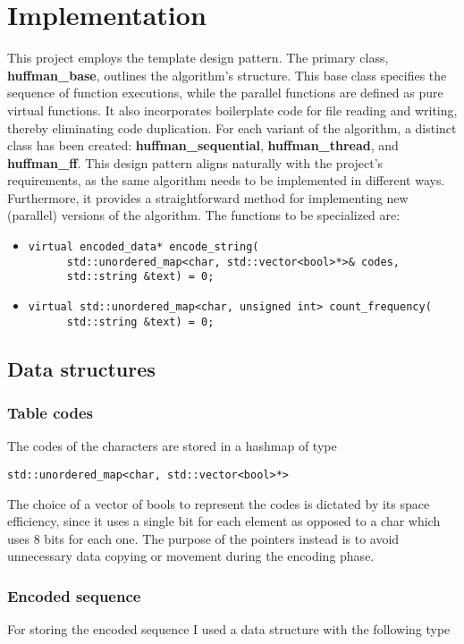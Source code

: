 \documentclass{article}
\begin{document}
\section{Implementation}
This project employs the template design pattern. The primary class, \textbf{huffman\_base}, outlines the algorithm's structure.
This base class specifies the sequence of function executions, while the parallel functions are defined as pure virtual functions.
It also incorporates boilerplate code for file reading and writing, thereby eliminating code duplication.
For each variant of the algorithm, a distinct class has been created: \textbf{huffman\_sequential}, \textbf{huffman\_thread}, and \textbf{huffman\_ff}.
This design pattern aligns naturally with the project's requirements, as the same algorithm needs to be implemented in different ways.
Furthermore, it provides a straightforward method for implementing new (parallel) versions of the algorithm.
The functions to be specialized are:
\begin{itemize}
    \item \begin{verbatim}
virtual encoded_data* encode_string(
      std::unordered_map<char, std::vector<bool>*>& codes,
      std::string &text) = 0;
\end{verbatim}
    \item \begin{verbatim}
virtual std::unordered_map<char, unsigned int> count_frequency(
      std::string &text) = 0;
    \end{verbatim}
\end{itemize}

\subsection{Data structures}
\subsubsection{Table codes}
The codes of the characters are stored in a hashmap of type
\begin{verbatim}
std::unordered_map<char, std::vector<bool>*>
\end{verbatim}
The choice of a vector of bools to represent the codes is dictated by its space efficiency, since it uses a single bit for each element
as opposed to a char which uses 8 bits for each one.
The purpose of the pointers instead is to avoid unnecessary data copying or movement during the encoding phase.
\subsubsection{Encoded sequence}
For storing the encoded sequence I used a data structure with the following type
\end{document}
